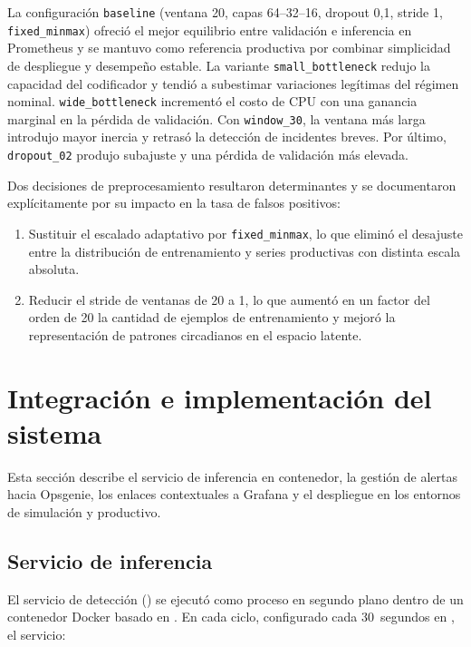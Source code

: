 La configuración \texttt{baseline} (ventana 20, capas 64--32--16, dropout 0,1, stride 1, \texttt{fixed\_minmax}) ofreció el mejor equilibrio entre validación e inferencia en Prometheus y se mantuvo como referencia productiva por combinar simplicidad de despliegue y desempeño estable. La variante \texttt{small\_bottleneck} redujo la capacidad del codificador y tendió a subestimar variaciones legítimas del régimen nominal. \texttt{wide\_bottleneck} incrementó el costo de CPU con una ganancia marginal en la pérdida de validación. Con \texttt{window\_30}, la ventana más larga introdujo mayor inercia y retrasó la detección de incidentes breves. Por último, \texttt{dropout\_02} produjo subajuste y una pérdida de validación más elevada.

Dos decisiones de preprocesamiento resultaron determinantes y se documentaron explícitamente por su impacto en la tasa de falsos positivos:

\begin{enumerate}
\item Sustituir el escalado adaptativo por \texttt{fixed\_minmax}, lo que eliminó el desajuste entre la distribución de entrenamiento y series productivas con distinta escala absoluta.
\item Reducir el stride de ventanas de 20 a 1, lo que aumentó en un factor del orden de 20 la cantidad de ejemplos de entrenamiento y mejoró la representación de patrones circadianos en el espacio latente.
\end{enumerate}

\section{Integración e implementación del sistema}
\label{sec:integracion}

Esta sección describe el servicio de inferencia en contenedor, la gestión de alertas hacia Opsgenie, los enlaces contextuales a Grafana y el despliegue en los entornos de simulación y productivo.

\subsection{Servicio de inferencia}

El servicio de detección () se ejecutó como proceso en segundo plano dentro de un contenedor Docker basado en . En cada ciclo, configurado cada 30~segundos en , el servicio:

